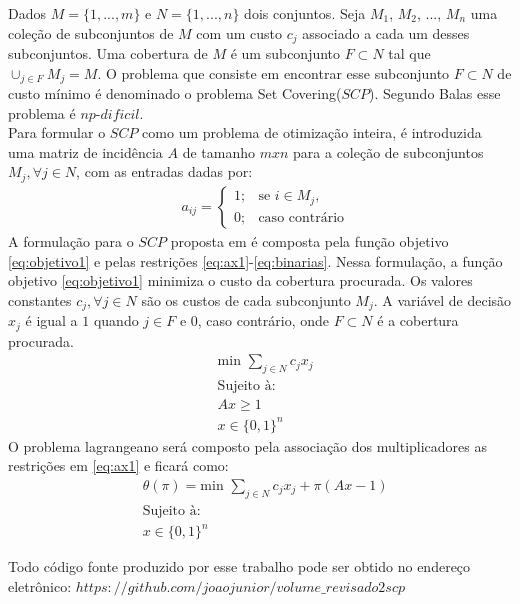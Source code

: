 \documentclass{proc}
\begin{document}
Dados $M=\{1,...,m\}$ e $N=\{1,...,n\}$ dois conjuntos. Seja $M_1$, $M_2$, ..., $M_n$ uma coleção de subconjuntos 
de $M$ com um custo $c_j$ associado a cada um desses subconjuntos. Uma cobertura de $M$ é um subconjunto 
$F \subset N$ tal que $\cup_{j \in F} M_j = M$. O problema que consiste em encontrar esse subconjunto $F \subset N$ de custo mínimo
é denominado o problema Set Covering($SCP$). Segundo Balas\cite{balas89} esse problema é $np$-$dificil$. \\
Para formular o $SCP$ como um problema
de otimização inteira, é introduzida uma matriz de incidência $A$ de tamanho $mxn$ para a coleção de subconjuntos 
$M_j, \forall j \in N$, com as entradas dadas por: \
\begin{align}
    & a_{ij} = \left \{\begin{array}{ll} 1; & \textrm{se } i \in M_j \textrm{,} \nonumber \\
    0; & \textrm{caso contrário} \nonumber
    \end{array}\right. \nonumber
\end{align}
A formulação para o $SCP$ proposta em \cite{Bertsimas05} é composta pela função objetivo \eqref{eq:objetivo1}
e pelas restrições \eqref{eq:ax1}-\eqref{eq:binarias}. Nessa formulação, a função objetivo \eqref{eq:objetivo1} minimiza o custo da cobertura procurada. 
Os valores constantes $c_j, \forall j \in N$ são os custos de cada subconjunto $M_j$. 
A variável de decisão $x_j$ é igual a $1$ quando $j \in F$ e $0$, caso contrário, onde $F \subset N$ é a cobertura procurada. \\
\begin{align}
    & \text{min } \sum_{j \in N} c_jx_j \label{eq:objetivo1} \\
    & \text{Sujeito à:} \nonumber \\
    & Ax \ge 1 \label{eq:ax1} \\ 
    & x \in \{0,1\}^n \label{eq:binarias}
\end{align}
O problema lagrangeano será composto pela associação dos multiplicadores as restrições em \eqref{eq:ax1} e ficará
como:
\begin{align}
    & \theta (\pi) = \text{min } \sum_{j \in N} c_jx_j + \pi(Ax -1) \label{eq:objetivo2} \\
    & \text{Sujeito à:} \nonumber \\
    & x \in \{0,1\}^n \label{eq:binarias1}
\end{align}




Todo código fonte produzido por esse trabalho pode ser obtido no endereço eletrônico: $https://github.com/joaojunior/volume\_revisado2scp$


\end{document}
